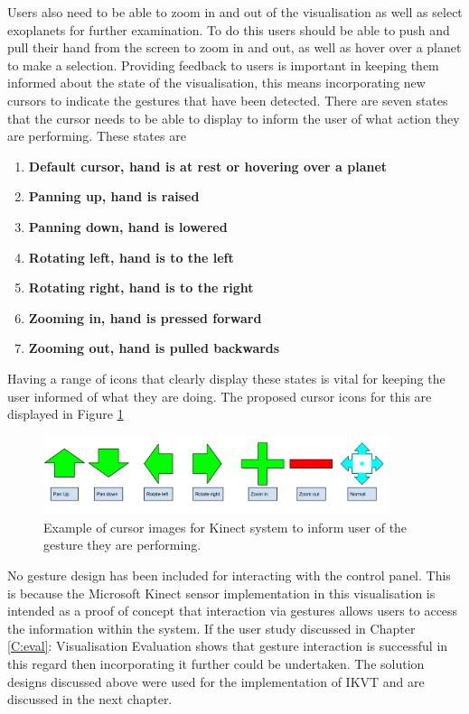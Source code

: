 \begin{enumerate}
Users also need to be able to
zoom in and out of the visualisation as well as select exoplanets for further
examination. To do this users should be able to
push and pull their hand from the screen to zoom in and out, as well as
hover over a planet to make a selection. Providing feedback to users is important in keeping them informed about the
state of the visualisation, this means
incorporating new cursors to indicate the gestures that have been detected.
There are seven states that the cursor needs to be able to display to inform the user
of what action they are performing. These states are

\begin{enumerate}
\item[1.]  {\bf Default cursor, hand is at rest or hovering over a planet}
 \item[2.] {\bf Panning up, hand is raised}
 \item[3.] {\bf Panning down, hand is lowered}
 \item[4.] {\bf Rotating left, hand is to the left}
 \item[5.] {\bf Rotating right, hand is to the right}
 \item[6.] {\bf Zooming in, hand is pressed forward}
 \item[7.] {\bf Zooming out, hand is pulled backwards}
 
\end{enumerate}
Having a range of icons that clearly display these states is vital for keeping
the user informed of what they are doing. The proposed cursor icons for this are
displayed in Figure \ref{fig:cursors}
\begin{figure}[H]
  \centering
      \includegraphics[width=0.9\textwidth]{images/curserImages.png}
  \caption[Example of cursor images for Kinect system]{Example of cursor images
for Kinect system to inform user of the gesture they are performing.}  
  \label{fig:cursors}
\end{figure}

No gesture design has been included for interacting with the control panel.
This is because the Microsoft Kinect sensor implementation in this visualisation
is intended as a proof of concept that interaction via gestures allows users
to access the information within the system. If the user study discussed in
Chapter \ref{C:eval}: Visualisation Evaluation shows that gesture interaction is
successful in this regard then incorporating it further could be undertaken.
 The solution designs discussed above were used for the
implementation of IKVT and are discussed in the next chapter.

\end{enumerate}